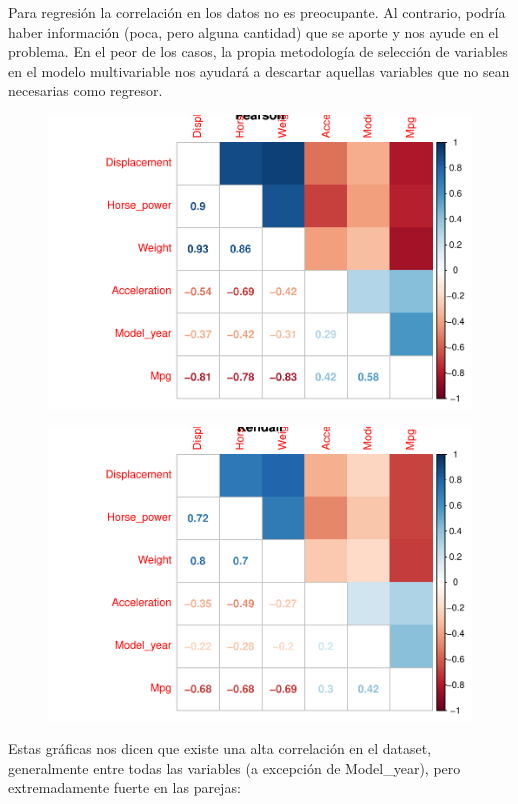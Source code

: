 \vspace{\baselineskip}

Para regresión la correlación en los datos no es preocupante. Al contrario, podría haber información (poca, pero alguna cantidad) que se aporte y nos ayude en el problema. En el peor de los casos, la propia metodología de selección de variables en el modelo multivariable nos ayudará a descartar aquellas variables que no sean necesarias como regresor.

\begin{figure}[H]\includegraphics[width=.9\linewidth]{img/EDA_files/figure-latex/unnamed-chunk-19-1} \caption{}\end{figure}
\begin{figure}[H]\includegraphics[width=.9\linewidth]{img/EDA_files/figure-latex/unnamed-chunk-19-2} \caption{}\end{figure}

\newpage

Estas gráficas nos dicen que existe una alta correlación en el dataset, generalmente entre todas las variables (a excepción de Model\_year), pero extremadamente fuerte en las parejas:

